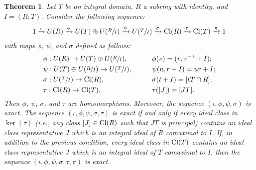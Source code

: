\documentclass[12pt]{amsart}
\newtheorem{theorem}{Theorem}[section]
\theoremstyle{definition}
\newcommand{\Cl}{\textup{Cl}}
\begin{document}
\begin{theorem}
    \label{exact sequence}
    Let $T$ be an integral domain, $R$ a subring with identity, and $I=(R:T)$. Consider the following sequence:
    $$1\xrightarrow{\iota} U(R)\xrightarrow{\phi} U(T)\oplus U(\sfrac{R}{I})\xrightarrow{\psi} U(\sfrac{T}{I})\xrightarrow{\sigma} \Cl(R)\xrightarrow{\tau}\Cl(T)\xrightarrow{\pi}1$$
    with maps $\phi$, $\psi$, and $\sigma$ defined as follows:
    \begin{alignat*}{2}
        &\phi:U(R)\to U(T)\oplus U(\sfrac{R}{I}),&&\quad\quad\phi(v)=(v,v^{-1}+I);\\
        &\psi:U(T)\oplus U(\sfrac{R}{I})\to U(\sfrac{T}{I}),&&\quad\quad\psi(u,r+I)=ur+I;\\
        &\sigma:U(\sfrac{T}{I})\to \Cl(R),&&\quad\quad\sigma(t+I)=[tT\cap R];\\
        &\tau:\Cl(R)\to\Cl(T),&&\quad\quad\tau([J])=[JT].
    \end{alignat*}
    Then $\phi$, $\psi$, $\sigma$, and $\tau$ are homomorphisms. Moreover, the sequence $(\iota,\phi,\psi,\sigma)$ is exact. The sequence $(\iota,\phi,\psi,\sigma,\tau)$ is exact if and only if every ideal class in $\ker(\tau)$ (i.e., any class $[J]\in\Cl(R)$ such that $JT$ is principal) contains an ideal class representative $J$ which is an integral ideal of $R$ comaximal to $I$. If, in addition to the previous condition, every ideal class in $\Cl(T)$ contains an ideal class representative $J$ which is an integral ideal of $T$ comaximal to $I$, then the sequence $(\iota,\phi,\psi,\sigma,\tau,\pi)$ is exact.
\end{theorem}
\end{document}
